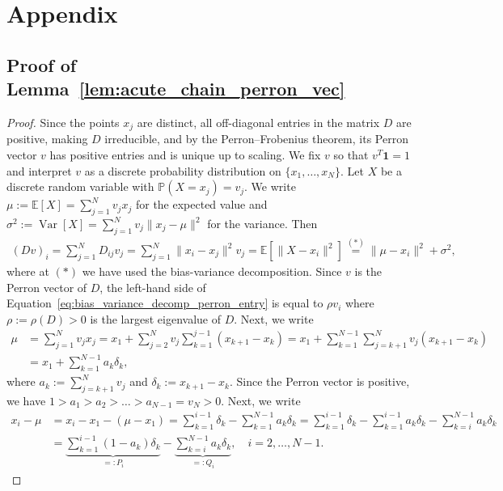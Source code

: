 \chapter{Appendix}\label{chap:appendix}

\section{Proof of Lemma~\ref{lem:acute_chain_perron_vec}}\label{sec:proof_acute_chain_perron_vec}

\begin{proof}
    Since the points $x_j$ are distinct, all off-diagonal entries in the matrix $D$ are positive, making $D$ irreducible, and by the Perron--Frobenius theorem, its Perron vector $v$ has positive entries and is unique up to scaling. We fix $v$ so that $v^{T}\mathbf{1}=1$ and interpret $v$ as a discrete probability distribution on $\{x_1,\dots,x_N\}$. Let $X$ be a discrete random variable with $\mathbb{P}(X=x_j)=v_j$. We write $\mu:=\mathbb{E}[X]=\sum_{j=1}^{N}v_jx_j$ for the expected value and $\sigma^2:=\operatorname{Var}[X]=\sum_{j=1}^{N}v_j\|x_j-\mu\|^2$ for the variance. Then
    \begin{align}\label{eq:bias_variance_decomp_perron_entry}
        (Dv)_i=\sum_{j=1}^{N}D_{ij}v_j=\sum_{j=1}^{N}\|x_i-x_j\|^2v_j=\mathbb{E}[\|X-x_i\|^2]\stackrel{(\ast)}{=}\|\mu-x_i\|^2+\sigma^2,
    \end{align}
    where at $(\ast)$ we have used the bias-variance decomposition. Since $v$ is the Perron vector of $D$, the left-hand side of Equation~\eqref{eq:bias_variance_decomp_perron_entry} is equal to $\rho v_i$ where $\rho:=\rho(D)>0$ is the largest eigenvalue of $D$. Next, we write
    \begin{align*}
        \mu&=\sum_{j=1}^{N}v_jx_j=x_1+\sum_{j=2}^{N}v_j\sum_{k=1}^{j-1}(x_{k+1}-x_k)=x_1+\sum_{k=1}^{N-1}\sum_{j=k+1}^{N}v_j(x_{k+1}-x_k)\\&
        =x_1+\sum_{k=1}^{N-1}a_k\delta_k,
    \end{align*}
    where $a_k:=\sum_{j=k+1}^{N}v_j$ and $\delta_k:=x_{k+1}-x_k$. Since the Perron vector is positive, we have $1>a_1>a_2>\dots>a_{N-1}=v_N>0$. Next, we write
    \begin{align*}
        x_i-\mu&=x_i-x_1-(\mu-x_1)=\sum_{k=1}^{i-1}\delta_k-\sum_{k=1}^{N-1}a_k\delta_k=\sum_{k=1}^{i-1}\delta_k-\sum_{k=1}^{i-1}a_k\delta_k-\sum_{k=i}^{N-1}a_k\delta_k\\&
        =\underbrace{\sum_{k=1}^{i-1}(1-a_k)\delta_k}_{=:P_i}-\underbrace{\sum_{k=i}^{N-1}a_k\delta_k}_{=:Q_i},\quad i=2,\dots,N-1.

\end{align*}
\end{proof}
